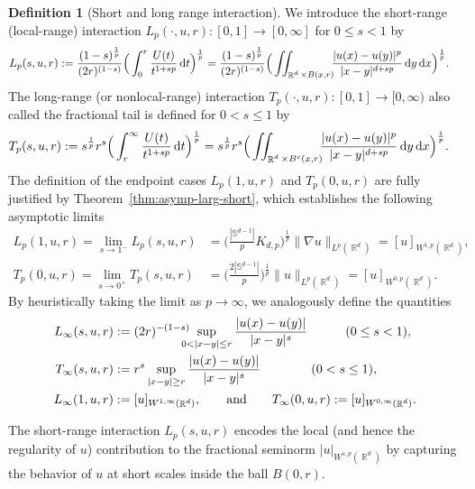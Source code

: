\documentclass[12pt, reqno]{amsart}%
\theoremstyle{plain}  %
\theoremstyle{definition}  %
\newtheorem{definition}[theorem]{Definition}
\theoremstyle{remark}
\numberwithin{equation}{section}
\DeclareMathOperator{\R}{\mathbb{R}}
\renewcommand{\d}{\,\mathrm{d}}
\begin{document}
\begin{definition}[Short and long range interaction]
\label{def:long-short-range}
\noindent We introduce the  short-range (local-range) interaction  $L_p(\cdot,u,r):[0,1]\to [0,\infty]$  for $0\leq s< 1$ by
\begin{align*}
 L_p(s, u,r)&:= \frac{(1-s)^{\frac{1}{p}}}{(2r)^{(1-s)} } \Big(\int_0^r \frac{U(t)}{t^{1+s p}} \d t\Big)^{\frac{1}{p}}=\frac{(1-s)^{\frac{1}{p}}}{(2r)^{(1-s)} } \Big(\iint_{\R^d \times B(x,r)} \hspace{-1ex} \frac{ |u(x) - u(y)|^p}{|x-y|^{d+s p}}\d y \d x\Big)^{\frac{1}{p}}.
\end{align*}
 The long-range (or nonlocal-range) interaction $T_p(\cdot,u,r):[0,1]\to [0,\infty)$ also called the fractional tail is defined  for $0<s\leq 1$ by
\begin{align*}
T_p(s, u,r)&:= s^{\frac{1}{p}}r^{s}\Big(\int_r^\infty \frac{U(t)}{t^{1+s p}} \d t\Big)^{\frac{1}{p}}=s^{\frac{1}{p}}r^{s} \Big(\iint_{\R^d \times B^c(x,r)} \hspace{-1ex} \frac{ |u(x) - u(y)|^p}{|x-y|^{d+s p}}\d y \d x\Big)^{\frac{1}{p}}.
\end{align*}
The definition of the endpoint cases $L_p(1, u, r)$ and $T_p(0, u, r)$ are fully justified by Theorem~\ref{thm:asymp-larg-short}, which establishes the following asymptotic limits
\begin{align*}
L_p(1, u,r)= \lim_{s\to1^-} L_p(s, u,r)
&= \Big(\frac{|\mathbb{S}^{d-1}|}{p} K_{d,p}\Big)^{\frac{1}{p}}\|\nabla u\|_{L^p(\R^d)}= [u]_{W^{1,p}(\R^d)},\\
T_p(0, u,r)= \lim_{s\to0^+} T_p(s, u,r)
&=\Big(\frac{2|\mathbb{S}^{d-1}|}{p}\Big)^{\frac{1}{p}}\|u\|_{L^p(\R^d)}=[u]_{W^{0,p}(\R^d)}.
\end{align*}
By heuristically taking the limit as $p \to \infty$, we analogously define the quantities
\begin{align*}
 L_\infty(s, u,r)
&:=(2r)^{-(1-s)}\hspace{-2ex}\sup_{0<|x-y|\leq r} \frac{|u(x)-u(y)|}{|x-y|^s}\quad \qquad (0\leq s< 1),
\\
 T_\infty(s, u,r) & := r^{s}\sup_{|x-y|\geq r} \frac{|u(x)-u(y)|}{|x-y|^s} \quad \qquad\quad  (0<s\leq 1),\\
L_\infty(1,u,r) &:= [u]_{W^{1,\infty}(\R^d)},
\qquad\text{and}\qquad  T_\infty(0,u,r) :=[u]_{W^{0,\infty}(\R^d)}.
\end{align*}
\end{definition}
The short-range interaction  $L_p(s,u,r)$ encodes  the local (and hence the regularity of $u$) contribution to the fractional seminorm $|u|_{W^{s,p}(\R^d)}$  by  capturing  the behavior of $u$ at short scales inside the ball $ B(0,r)$.
\end{document}
